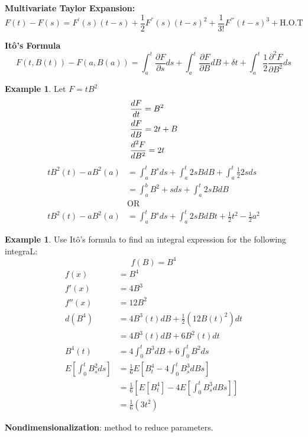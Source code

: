 \documentclass[12pt,letterpaper]{amsart}
\theoremstyle{plain}
\theoremstyle{definition}
\newtheorem{example}[theorem]{Example}
\numberwithin{equation}{section}
\begin{document}
\textbf{Multivariate Taylor Expansion:} $$F(t)-F(s)=F^{\prime}(s)(t-s)+\frac{1}{2}F^{''} (s)(t-s)^2 + \frac{1}{3!}F^{'''}(t-s)^3+ \text{H.O.T}$$

\textbf{It\^{o}'s Formula} $$\displaystyle F(t, B(t))-F(a,B(a))= \int_{a}^{t} \frac{\partial F}{\partial s}ds+ \int_a^t \frac{\partial F}{\partial B} dB+ \delta t+ \int_a^t \frac{1}{2} \frac{\partial^2 F}{\partial B^2} ds$$

\begin{example}
Let $F=tB^2$ 
\begin{align*}
\displaystyle
&\frac{dF}{dt}= B^2\\
&\frac{dF}{dB}=2t+B\\ 
&\frac{d^2 F}{dB^2}=2t
\end{align*}
\begin{align*}
tB^2(t)-aB^2(a) &=\int_{a}^{t}B^s ds+ \int_{a}^{t}2sBdB+\int_a^t \frac{1}{2}2sds\\
 &=\int_a^b B^2+sds+\int_a^t 2sBdB\\
 &\text{OR}\\
tB^2(t)-aB^2(a) &= \int_a^t B^s ds+ \int_a^t 2sBdBt+ \frac{1}{2} t^2- \frac{1}{2}a^2
\end{align*}
\end{example}

\begin{example} Use It\^o's formula to find an integral expression for the following integraL:
$$f(B)=B^4$$
\begin{align*}
f(x)&=B^4\\
f'(x)&=4B^3\\
f''(x)&=12B^2\\
d(B^4)&= 4B^3(t)dB+\frac{1}{2}(12B(t)^2)dt\\
	&=4B^3(t)dB+6B^2(t)dt\\
B^4(t)&= 4 \int_0^t B^3 dB+ 6 \int_0^t B^2 ds\\
E\left[\int_0^t B_s^2 ds\right] &= \frac{1}{6}E \left[B_t^4-4 \int_0^tB_s^3 dBs \right]\\
 &=\frac{1}{6}  \left[E \left[B_t^4\right]-4E\left[\int_0^t B_s^3 dBs \right] \right]\\
 &=\frac{1}{6}(3t^2)
\end{align*}
\end{example}

\textbf{Nondimensionalization}: method to reduce parameters. 
\end{document}
